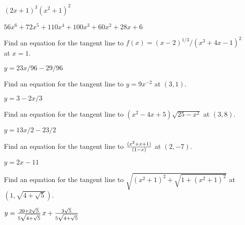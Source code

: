 \begin{exercises}
\begin{exercise} $(2x+1)^3(x^2+1)^2$
\begin{answer} $56x^6+72x^5+110x^4+100x^3+60x^2+28x+6$
\end{answer}\end{exercise}

\endtwocol
\bsk

\begin{exercise}  Find an equation for the tangent line to 
$f(x) = (x-2)^{1/3}/(x^3 + 4x - 1)^2$ at $x=1$.
\begin{answer} $y=23x/96-29/96$
\end{answer}\end{exercise}

\begin{exercise} Find an equation for the tangent line to $y=9x^{-2}$ at $(3,1)$.
\begin{answer} $y=3-2x/3$
\end{answer}\end{exercise}

\begin{exercise} Find an equation for the tangent line to $(x^2-4x+5)\sqrt{25-x^2}$ 
at $(3,8)$.
\begin{answer} $y=13x/2-23/2$
\end{answer}\end{exercise}

\begin{exercise} Find an equation for the tangent line to ${(x^2+x+1)\over(1-x)}$ 
at $(2,-7)$.
\begin{answer} $y=2x-11$
\end{answer}\end{exercise}

\begin{exercise} Find an equation for the tangent line to 
$\sqrt{(x^2+1)^2+\sqrt{1+(x^2+1)^2}}$
at $(1,\sqrt{4+\sqrt{5}})$.
\begin{answer} $y=
{20+2\sqrt5\over5\sqrt{4+\sqrt5}}\,x+{3\sqrt5\over5\sqrt{4+\sqrt5}}$
\end{answer}\end{exercise}

\end{exercises}















